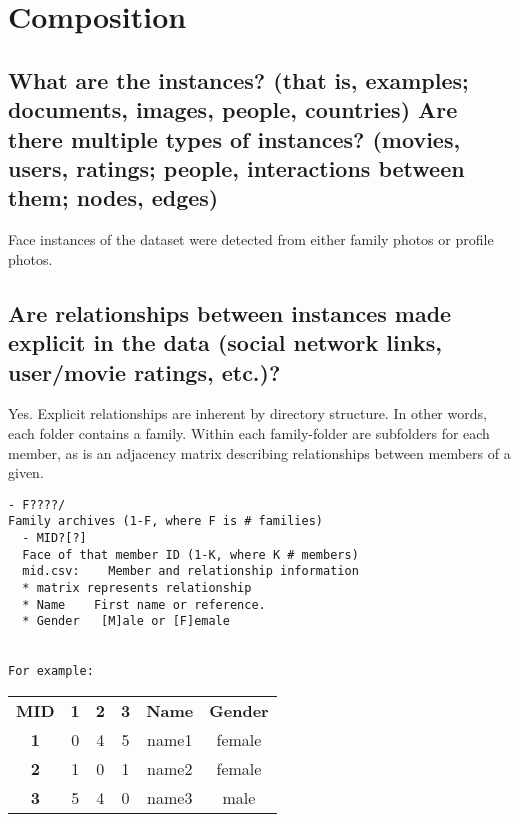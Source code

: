 \section*{Composition}
\subsection*{What are the instances? (that is, examples; \eg documents, images, people, countries) Are there multiple types of instances? (\eg movies, users, ratings; people, interactions between them; nodes, edges)}
\noindent
Face instances of the dataset were detected from either family photos or profile photos.

\subsection*{Are relationships between instances made explicit in the data (\eg social network links, user/movie ratings, etc.)?}
\noindent
Yes. Explicit relationships are inherent by directory structure. In other words, each folder contains a family. Within each family-folder are subfolders for each member, as is an adjacency matrix describing relationships between members of a given.

\begin{lstlisting}
- F????/    
Family archives (1-F, where F is # families)
  - MID?[?]
  Face of that member ID (1-K, where K # members)
  mid.csv:    Member and relationship information
  * matrix represents relationship
  * Name    First name or reference.
  * Gender   [M]ale or [F]emale
  
      
For example:
\end{lstlisting}
\begin{center}
    

\begin{tabular}{cccccc}
\textbf{MID} &     \textbf{1}   &    \textbf{2} &      \textbf{3} &  \textbf{Name}  &   \textbf{Gender}\\
\textbf{1} &      0  &     4  &     5&   name1   &  female\\
\textbf{2}  &     1   &    0  &     1&   name2&     female\\
\textbf{3} &     5  &     4  &     0&   name3 &  male\\
\end{tabular}
\end{center}

